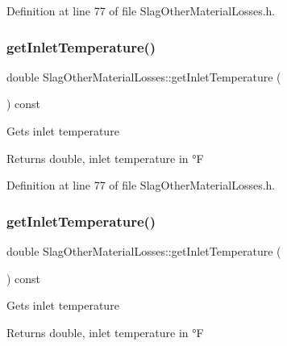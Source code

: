 Definition at line 77 of file Slag\+Other\+Material\+Losses.\+h.

\mbox{\label{class_slag_other_material_losses_aebd0f1b7d6c4bf0deb8ce8a86c5a80a7}} 
\subsubsection{\texorpdfstring{get\+Inlet\+Temperature()}{getInletTemperature()}\hspace{0.1cm}{\footnotesize\ttfamily [2/3]}}
{\footnotesize\ttfamily double Slag\+Other\+Material\+Losses\+::get\+Inlet\+Temperature (\begin{DoxyParamCaption}{ }\end{DoxyParamCaption}) const\hspace{0.3cm}{\ttfamily [inline]}}

Gets inlet temperature \begin{DoxyReturn}{Returns}
double, inlet temperature in °F 
\end{DoxyReturn}


Definition at line 77 of file Slag\+Other\+Material\+Losses.\+h.

\mbox{\label{class_slag_other_material_losses_aebd0f1b7d6c4bf0deb8ce8a86c5a80a7}} 
\subsubsection{\texorpdfstring{get\+Inlet\+Temperature()}{getInletTemperature()}\hspace{0.1cm}{\footnotesize\ttfamily [3/3]}}
{\footnotesize\ttfamily double Slag\+Other\+Material\+Losses\+::get\+Inlet\+Temperature (\begin{DoxyParamCaption}{ }\end{DoxyParamCaption}) const\hspace{0.3cm}{\ttfamily [inline]}}

Gets inlet temperature \begin{DoxyReturn}{Returns}
double, inlet temperature in °F 
\end{DoxyReturn}


